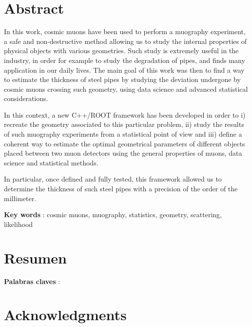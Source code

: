 \documentclass[a4paper, 11pt]{report}
\begin{document}

\clearpage
\thispagestyle{empty}
\phantom{a}
\vfill
\newpage


\setcounter{page}{1}

\section*{\huge{Abstract}}

In this work, cosmic muons have been used to perform a muography experiment, a safe and non-destructive method allowing us to study the internal properties of physical objects with various geometries. Such study is extremely useful in the industry, in order for example to study the degradation of pipes, and finds many application in our daily lives. The main goal of this work was then to find a way to estimate the thickness of steel pipes by studying the deviation undergone by cosmic muons crossing such geometry, using data science and advanced statistical considerations.

In this context, a new C++/ROOT framework has been developed in order to i) recreate the geometry associated to this particular problem, ii) study the results of such muography experiments from a statistical point of view and iii) define a coherent way to estimate the optimal geometrical parameters of different objects placed between two muon detectors using the general properties of muons, data science and statistical methods.

In particular, once defined and fully tested, this framework allowed us to determine the thickness of such steel pipes with a precision of the order of the millimeter.

\begin{center}
\textbf{Key words} : cosmic muons, muography, statistics, geometry, scattering, likelihood
\end{center}

\section*{\huge{Resumen}} 

\begin{center}
\textbf{Palabras claves} : 
\end{center}

\newpage


\section*{\huge{Acknowledgments}}
\end{document}

